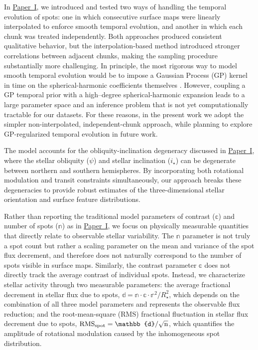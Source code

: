 \documentclass[twocolumn]{aastex631}
\newcommand{\paperone}{\hyperlink{cite.paper1}{Paper~I}}
\begin{document}
In \paperone, we introduced and tested two ways of handling the temporal evolution of spots: 
one in which consecutive surface maps were linearly interpolated to enforce smooth temporal evolution, 
and another in which each chunk was treated independently. Both approaches produced consistent qualitative behavior, 
but the interpolation-based method introduced stronger correlations between adjacent chunks, 
making the sampling procedure substantially more challenging. In principle, the most rigorous way to model smooth 
temporal evolution would be to impose a Gaussian Process (GP) kernel in time on the spherical-harmonic coefficients 
themselves \citep{Luger2021b}. However, coupling a GP temporal prior with a high–degree spherical-harmonic expansion leads to a 
large parameter space and an inference problem that is not yet computationally tractable for our datasets. 
For these reasons, in the present work we adopt the simpler non-interpolated, independent-chunk approach, 
while planning to explore GP-regularized temporal evolution in future work.

The model accounts for the obliquity-inclination degeneracy discussed in \paperone, where the stellar obliquity ($\psi$) 
and stellar inclination ($i_{\star}$) can be degenerate between northern and southern hemispheres. By incorporating 
both rotational modulation and transit constraints simultaneously, our approach breaks these degeneracies 
to provide robust estimates of the three-dimensional stellar orientation and surface feature distributions.

Rather than reporting the traditional model parameters of contrast ($\mathbb{c}$)
and number of spots ($\mathbb{n}$) as in \paperone, we focus on physically measurable quantities 
that directly relate to observable stellar variability. The $\mathbb{n}$ parameter is not truly a spot count but 
rather a scaling parameter on the mean and variance of the spot flux decrement, and therefore does not naturally 
correspond to the number of spots visible in surface maps. Similarly, the contrast parameter $\mathbb{c}$ does not directly 
track the average contrast of individual spots. Instead, we characterize stellar activity through two measurable 
parameters: the average fractional decrement in stellar flux due to spots, 
$\mathbb{d} = \mathbb{n} \cdot \mathbb{c} \cdot \mathbb{r}^2/R_{\star}^2$, 
which depends on the combination of all three model parameters and represents the observable flux reduction; and the 
root-mean-square (RMS) fractional fluctuation in stellar flux decrement due to spots, 
$\rm{RMS}_{\rm spot} = \mathbb{d} / \sqrt{n}$, which quantifies the amplitude of rotational modulation 
caused by the inhomogeneous spot distribution.
\end{document}
